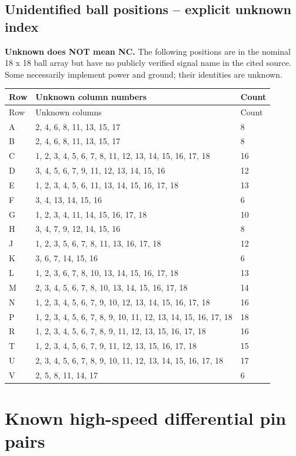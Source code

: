 \documentclass[10pt,a4paper]{article}
\begin{document}
\subsection{Unidentified ball positions -- explicit unknown index}
\textbf{Unknown does NOT mean NC.} The following positions are in the nominal 18 x 18 ball array but have no publicly verified signal name in the cited source. Some necessarily implement power and ground; their identities are unknown.\par
\small
\begin{longtable}{@{}p{16mm}p{125mm}p{16mm}@{}}\toprule
Row & Unknown column numbers & Count\\\midrule\endfirsthead
\toprule Row & Unknown columns & Count\\\midrule\endhead
A & 2, 4, 6, 8, 11, 13, 15, 17 & 8\\
B & 2, 4, 6, 8, 11, 13, 15, 17 & 8\\
C & 1, 2, 3, 4, 5, 6, 7, 8, 11, 12, 13, 14, 15, 16, 17, 18 & 16\\
D & 3, 4, 5, 6, 7, 9, 11, 12, 13, 14, 15, 16 & 12\\
E & 1, 2, 3, 4, 5, 6, 11, 13, 14, 15, 16, 17, 18 & 13\\
F & 3, 4, 13, 14, 15, 16 & 6\\
G & 1, 2, 3, 4, 11, 14, 15, 16, 17, 18 & 10\\
H & 3, 4, 7, 9, 12, 14, 15, 16 & 8\\
J & 1, 2, 3, 5, 6, 7, 8, 11, 13, 16, 17, 18 & 12\\
K & 3, 6, 7, 14, 15, 16 & 6\\
L & 1, 2, 3, 6, 7, 8, 10, 13, 14, 15, 16, 17, 18 & 13\\
M & 2, 3, 4, 5, 6, 7, 8, 10, 13, 14, 15, 16, 17, 18 & 14\\
N & 1, 2, 3, 4, 5, 6, 7, 9, 10, 12, 13, 14, 15, 16, 17, 18 & 16\\
P & 1, 2, 3, 4, 5, 6, 7, 8, 9, 10, 11, 12, 13, 14, 15, 16, 17, 18 & 18\\
R & 1, 2, 3, 4, 5, 6, 7, 8, 9, 11, 12, 13, 15, 16, 17, 18 & 16\\
T & 1, 2, 3, 4, 5, 6, 7, 9, 11, 12, 13, 15, 16, 17, 18 & 15\\
U & 2, 3, 4, 5, 6, 7, 8, 9, 10, 11, 12, 13, 14, 15, 16, 17, 18 & 17\\
V & 2, 5, 8, 11, 14, 17 & 6\\
\bottomrule\end{longtable}
\normalsize
\section{Known high-speed differential pin pairs}
\end{document}
